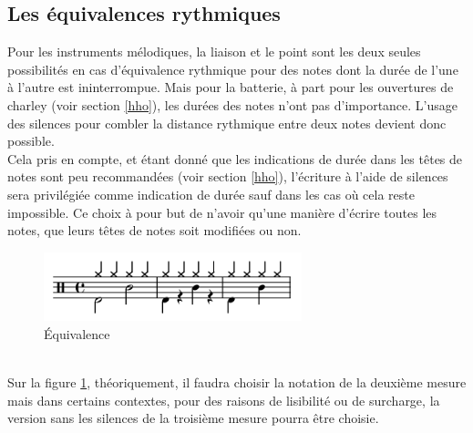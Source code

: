 \subsection*{Les équivalences rythmiques}
Pour les instruments mélodiques, la liaison et le point sont les deux seules possibilités en cas d’équivalence rythmique pour des notes dont la durée de l’une à l’autre est ininterrompue. Mais pour la batterie, à part pour les ouvertures de charley (voir section \ref{hho}), les durées des notes n’ont pas d’importance. L’usage des silences pour combler la distance rythmique entre deux notes devient donc possible.\\
Cela pris en compte, et étant donné que les indications de durée dans les têtes de notes sont peu recommandées (voir section \ref{hho}), l’écriture à l’aide de silences sera privilégiée comme indication de durée sauf dans les cas où cela reste impossible. Ce choix à pour but de n’avoir qu’une manière d’écrire toutes les notes, que leurs têtes de notes soit modifiées ou non.
\begin{figure}[h]
	\centering
	\includegraphics[height=20mm, width=75mm]{z_images/3_methodes/0_notation_de_la_batterie/6_equivalence.png}
	\caption{Équivalence}
	\label{equivalence}
\end{figure}\\
Sur la figure \ref{equivalence}, théoriquement, il faudra choisir la notation de la deuxième mesure mais dans certains contextes, pour des raisons de lisibilité ou de surcharge, la version sans les silences de la troisième mesure pourra être choisie.
